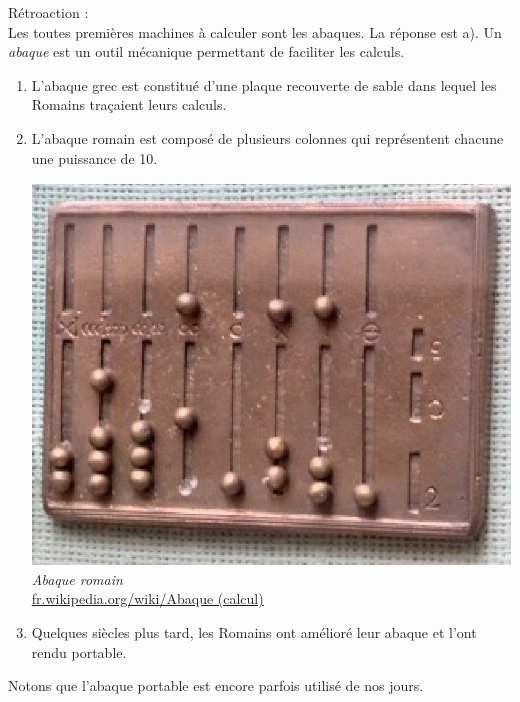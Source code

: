 \documentclass[letterpaper, 12pt]{article}
\begin{document}
R\'etroaction :\\
Les toutes premi\`eres machines \`a calculer sont les abaques. La r\'eponse est a). Un \emph{abaque} est un outil m\'ecanique permettant de faciliter les calculs.
\begin{enumerate}
\item L'abaque grec est constitu\'e d'une plaque recouverte de sable dans lequel les Romains tra\c caient leurs calculs.
\item L'abaque romain est compos\'e de plusieurs colonnes qui repr\'esentent chacune une puissance de 10.
\begin{center}
\includegraphics[scale=0.4]{RomanAbacusRecon.eps}\\
\emph{{\small Abaque romain}}\\
\href{http://fr.wikipedia.org/wiki/Abaque_\%28calcul\%29#}{fr.wikipedia.org/wiki/Abaque (calcul)}\\
\end{center}
\item Quelques si\`ecles plus tard, les Romains ont am\'elior\'e leur abaque et l'ont rendu portable.
\end{enumerate}
Notons que l'abaque portable est encore parfois utilis\'e de nos jours.\\
\end{document}

